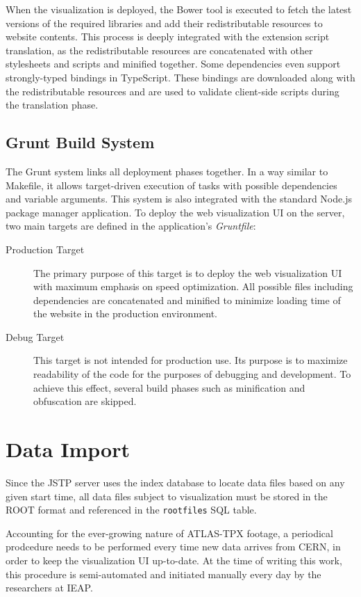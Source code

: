 When the visualization is deployed, the Bower tool is executed to fetch the latest versions of the required libraries and add their redistributable resources to website contents. This process is deeply integrated with the extension script translation, as the redistributable resources are concatenated with other stylesheets and scripts and minified together. Some dependencies even support strongly-typed bindings in TypeScript. These bindings are downloaded along with the redistributable resources and are used to validate client-side scripts during the translation phase.

\subsection{Grunt Build System}
The Grunt system links all deployment phases together. In a way similar to Makefile, it allows target-driven execution of tasks with possible dependencies and variable arguments. This system is also integrated with the standard Node.js package manager application. To deploy the web visualization UI on the server, two main targets are defined in the application's \textit{Gruntfile}:

\begin{description}
	\item[Production Target]
	The primary purpose of this target is to deploy the web visualization UI with maximum emphasis on speed optimization. All possible files including dependencies are concatenated and minified to minimize loading time of the website in the production environment.

	\item[Debug Target]
	This target is not intended for production use. Its purpose is to maximize readability of the code for the purposes of debugging and development. To achieve this effect, several build phases such as minification and obfuscation are skipped.
\end{description}

\section{Data Import}
Since the JSTP server uses the index database to locate data files based on any given start time, all data files subject to visualization must be stored in the ROOT format and referenced in the \texttt{rootfiles} SQL table.

Accounting for the ever-growing nature of ATLAS-TPX footage, a periodical prodcedure needs to be performed every time new data arrives from CERN, in order to keep the visualization UI up-to-date. At the time of writing this work, this procedure is semi-automated and initiated manually every day by the researchers at IEAP.

